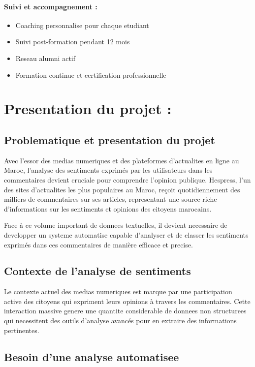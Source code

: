 \paragraph{Suivi et accompagnement :}
\begin{itemize}
    \item Coaching personnalise pour chaque etudiant
    \item Suivi post-formation pendant 12 mois
    \item Reseau alumni actif
    \item Formation continue et certification professionnelle
\end{itemize}

\section{Presentation du projet :}

\subsection{Problematique et presentation du projet}

Avec l'essor des medias numeriques et des plateformes d'actualites en ligne au Maroc, l'analyse des sentiments exprimés par les utilisateurs dans les commentaires devient cruciale pour comprendre l'opinion publique. Hespress, l'un des sites d'actualites les plus populaires au Maroc, reçoit quotidiennement des milliers de commentaires sur ses articles, representant une source riche d'informations sur les sentiments et opinions des citoyens marocains.

Face à ce volume important de donnees textuelles, il devient necessaire de developper un systeme automatise capable d'analyser et de classer les sentiments exprimés dans ces commentaires de manière efficace et precise.

\subsection{Contexte de l'analyse de sentiments}

Le contexte actuel des medias numeriques est marque par une participation active des citoyens qui expriment leurs opinions à travers les commentaires. Cette interaction massive genere une quantite considerable de donnees non structurees qui necessitent des outils d'analyse avancés pour en extraire des informations pertinentes.

\subsection{Besoin d'une analyse automatisee}

